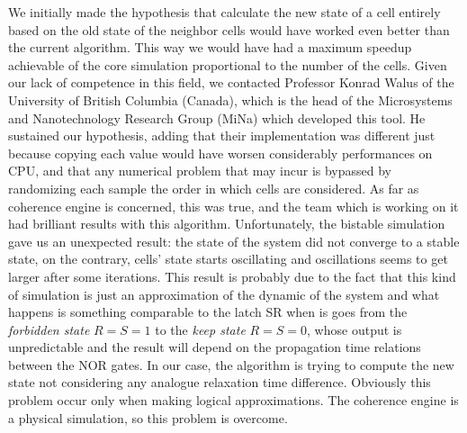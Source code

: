 We initially made the hypothesis that calculate the new state of a cell entirely based on the old state of the neighbor cells would have worked even better than the current algorithm. This way we would have had a maximum speedup achievable of the core simulation proportional to the number of the cells.
Given our lack of competence in this field, we contacted Professor Konrad Walus of the University of British Columbia (Canada), which is the head of the Microsystems and Nanotechnology Research Group (MiNa) which developed this tool. He sustained our hypothesis, adding that their implementation was different just because copying each value would have worsen considerably performances on CPU, and that any numerical problem that may incur is bypassed by randomizing each sample the order in which cells are considered.\newline
As far as coherence engine is concerned, this was true, and the team which is working on it had brilliant results with this algorithm. Unfortunately, the bistable simulation gave us an unexpected result: the state of the system did not converge to a stable state, on the contrary, cells' state starts oscillating and oscillations seems to get larger after some iterations. This result is probably due to the fact that this kind of simulation is just an approximation of the dynamic of the system and what happens is something comparable to the latch SR when is goes from the \textit{forbidden state} $R=S=1$ to the \textit{keep state} $R=S=0$, whose output is unpredictable and the result will depend on the propagation time relations between the NOR gates. In our case, the algorithm is trying to compute the new state not considering any analogue relaxation time difference. Obviously this problem occur only when making logical approximations. The coherence engine is a physical simulation, so this problem is overcome.

